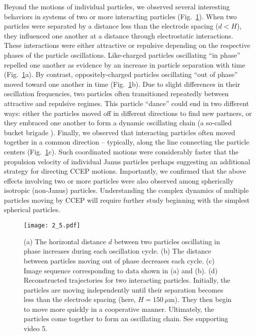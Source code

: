 Beyond the motions of individual particles, we observed several interesting  behaviors in systems of two or more interacting particles (Fig.~\ref{fig:5}).
When two particles were separated by a distance less than the electrode spacing ($d<H$), they influenced one another at a distance through electrostatic interactions.
These interactions were either attractive or repulsive depending on the respective phases of the particle oscillations\cite{mersch2011antiphase}.
Like-charged particles oscillating ``in phase'' repelled one another as evidence by an increase in particle separation with time (Fig.~\ref{fig:5}a).
By contrast, oppositely-charged particles oscillating ``out of phase'' moved toward one another in time (Fig.~\ref{fig:5}b).
Due to slight differences in their oscillation frequencies, two particles often transitioned repeatedly between attractive and repulsive regimes.
This particle ``dance'' could end in two different ways: either the particles moved off in different directions to find new partners, or they embraced one another to form a dynamic oscillating chain (a so-called bucket brigade \cite{Pelesko2004a}).
Finally, we observed that interacting particles often moved together in a common direction -- typically, along the line connecting the particle centers (Fig.~\ref{fig:5}c).
Such coordinated motions were considerably faster that the propulsion velocity of individual Janus particles perhaps suggesting an additional strategy for directing CCEP motions.
Importantly, we confirmed that the above effects involving two or more particles were also observed among spherically isotropic (non-Janus) particles.
Understanding the complex dynamics of multiple particles moving by CCEP will require further study beginning with the simplest spherical particles.

\begin{figure}[p]
\centering
\texttt{[image: 2\_5.pdf]}
\caption{(a) The horizontal distance $d$ between two particles oscillating in phase increases during each oscillation cycle. (b) The distance between particles moving out of phase decreases each cycle. (c) Image sequence corresponding to data shown in (a) and (b). (d) Reconstructed trajectories for two interacting particles.  Initially, the particles are moving independently until their separation becomes less than the electrode spacing (here, $H=150~\mu\text{m}$). They then begin to move more quickly in a cooperative manner.  Ultimately, the particles come together to form an oscillating chain. See supporting video 5.}
\label{fig:5}
\end{figure}



